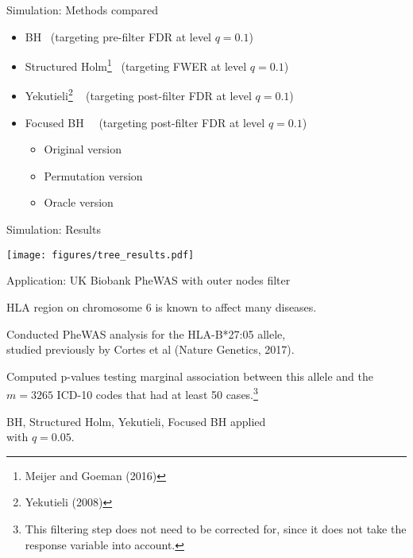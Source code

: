 \documentclass{beamer}
\begin{document}
\begin{frame}{Simulation: Methods compared}
	\begin{itemize}
		\item BH \qquad \qquad \qquad \ (targeting pre-filter FDR at level $q = 0.1$)
		\item Structured Holm\footnote{Meijer and Goeman (2016)} \ (targeting FWER at level $q = 0.1$)
		\item Yekutieli\footnote{Yekutieli (2008)} \quad \quad \quad \ \hspace{0.01in} (targeting post-filter FDR at level $q = 0.1$)
		\item Focused BH \quad \quad \ \ (targeting post-filter FDR at level $q = 0.1$)
		\begin{itemize}
			\item Original version
			\item Permutation version
			\item Oracle version
		\end{itemize}
	\end{itemize}
\end{frame}

\begin{frame}{Simulation: Results}
	\begin{center}
		\texttt{[image: figures/tree\_results.pdf]}
	\end{center}
\end{frame}

\begin{frame}{Application: UK Biobank PheWAS with outer nodes filter}

HLA region on chromosome 6 is known to affect many diseases.
\vspace{0.1in}

Conducted PheWAS analysis for the HLA-B*27:05 allele, \\ studied previously by Cortes et al (Nature Genetics, 2017).
\vspace{0.1in}

Computed p-values testing marginal association between this allele and the $m = 3265$ ICD-10 codes that had at least 50 cases.\footnote{This filtering step does not need to be corrected for, since it does not take the response variable into account.}
\vspace{0.1in}

BH, Structured Holm, Yekutieli, Focused BH applied \\ with $q = 0.05$.
\end{frame}
\end{document}
